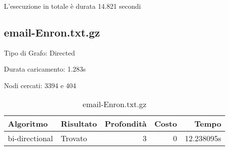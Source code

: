 L'esecuzione in totale è durata 14.821 secondi

\subsection{email-Enron.txt.gz}
Tipo di Grafo: Directed

Durata caricamento: 1.283s

Nodi cercati: 3394 e 404

\begin{table}[h]
\centering
\begin{tabular}{|l|l|r|r|r|}
\hline
\textbf{Algoritmo} & \textbf{Risultato} & \textbf{Profondità} & \textbf{Costo} & \textbf{Tempo} \\
 \hline
bi-directional & Trovato & 3 & 0 & 12.238095s \\
\hline
\end{tabular}
\caption{email-Enron.txt.gz}
\end{table}
